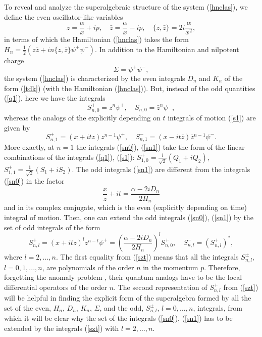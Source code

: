 \documentclass[a4paper,12pt]{article}
\begin{document}
To reveal and analyze the superalgebraic structure of the
system (\ref{hnclas}), we define the even
oscillator-like variables
$$
z=\frac{\alpha}{x}+ip,\quad
\bar z=\frac{\alpha}{x}-ip,\quad
\{z,\bar z\}=2i\frac{\alpha}{x^2},
$$
in terms of which
the Hamiltonian (\ref{hnclas}) takes the form
$
H_n=\frac{1}{2}(z\bar z+in\{z,\bar z\}\psi^+\psi^-).
$
In addition  to the Hamiltonian and nilpotent charge
\begin{equation}
\Sigma=\psi^+\psi^-,
\label{sigm}
\end{equation}
the system (\ref{hnclas}) is characterized by the
even integrals $D_n$ and $K_n$ of the form
(\ref{tdk}) (with the Hamiltonian (\ref{hnclas})).
But, instead of the odd quantities (\ref{q1}),
here we have the integrals
\begin{equation}
S^+_{n,0}=z^n\psi^+,\quad S^-_{n,0}=
\bar z^n\psi^-,
\label{sn0}
\end{equation}
whereas the analogs of
the explicitly depending on $t$
integrals of motion (\ref{s1})  are
given by
\begin{equation}
S^+_{n,1}=\left(x+itz\right)z^{n-1}\psi^+,\quad
S^-_{n,1}=\left(x-it\bar z \right)\bar{z}{}^{n-1}
\psi^-.
\label{sn1}
\end{equation}
More exactly,
at $n=1$ the integrals (\ref{sn0}),
(\ref{sn1}) take the
form of the linear combinations
of the integrals (\ref{q1}), (\ref{s1}):
$S^+_{1,0}=\frac{i}{\sqrt{2}}(Q_1+iQ_2)$,
$S^+_{1,1}=\frac{1}{\sqrt{2}}(S_1+iS_2)$.
The  odd integrals (\ref{sn1})
are different from the integrals
(\ref{sn0}) in the factor
$$
\frac{x}{z}+it=\frac{\alpha-2iD_n}{2H_n}
$$
and in its complex conjugate, which is
the even (explicitly depending on time)
integral of motion.
Then,
one can extend  the odd integrals (\ref{sn0}),
(\ref{sn1})
by the set of odd integrals of the form
\begin{equation}
S_{n,l}^+=(x+itz)^lz^{n-l}\psi^+=\left(\frac{\alpha-2iD_n}{2
H_n}
\right)^lS^+_{n,0},
\quad S^-_{n,l}=(S^+_{n,l})^*,
\label{szt}
\end{equation}
where $l=2,\dots, n$.
The first equality from (\ref{szt}) means that all the
integrals
$S^\pm_{n,l}$, $l=0,1,...,n$, are polynomials
of the order $n$ in the momentum $p$.
Therefore, forgetting the anomaly
problem \cite{P1,KP1},
their quantum analogs
have to be the local differential operators of
the order $n$.
The second representation of $S^+_{n,l}$ from (\ref{szt})
will be  helpful  in finding the explicit form of
the superalgebra formed by all the set of
the even,
$H_n$, $D_n$, $K_n$, $\Sigma$,
and the odd, $S^\pm_{n,l}$, $l=0,\ldots, n$,
integrals, from which it will be clear why
the set of the integrals (\ref{sn0}), (\ref{sn1})
has to be extended
by the integrals (\ref{szt}) with $l=2,\ldots, n$.
\end{document}

